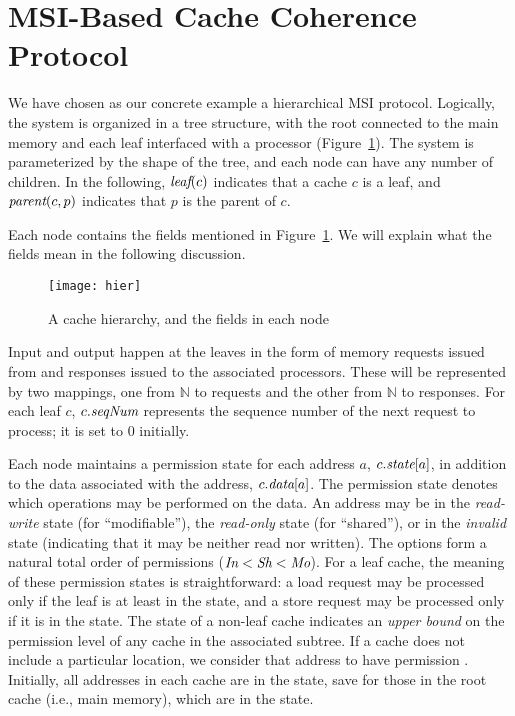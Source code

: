 \section{MSI-Based Cache Coherence Protocol}
\label{sec:System}

We have chosen as our concrete example a hierarchical MSI
protocol. Logically, the system is organized in a tree
structure, with the root connected to the main memory and each leaf interfaced
with a processor (Figure~\ref{hier}). The system is parameterized by the shape
of the tree, and each node can have any number of children.
In the following, $\textit{leaf}(c)$ indicates
that a cache $c$ is a leaf, and $\textit{parent}(c,p)$ indicates that $p$ is the parent of
$c$.

Each node contains the fields mentioned in Figure~\ref{hier}. We will
explain what the fields mean in the following discussion.

\begin{figure}
\centering
\texttt{[image: hier]}
\caption{A cache hierarchy, and the fields in each node}
\label{hier}
\end{figure}

Input and output happen at the leaves in the form of memory requests
issued from and responses issued to the associated processors. These will be
represented by two mappings, one from $\mathbb{N}$ to requests and the other
from $\mathbb{N}$ to responses. For each leaf $c$, $c.\textit{seqNum}$ represents the
sequence number of the next request to process; it is set to $0$ initially.

Each node maintains a permission state for each address $a$, $c.\textit{state}[a]$, in
addition to the data associated with the address, $c.\textit{data}[a]$. The permission
state denotes which operations may be performed on the data. An address may be
in the \emph{read-write} state \Mo{} (for ``modifiable''),
the \emph{read-only} state \Sh{} (for ``shared''), or in the \emph{invalid} state
\In{} (indicating that it may be neither read nor written). The options form a natural
total order of permissions ($\textit{In} < \textit{Sh} < \textit{Mo}$). For a leaf cache, the meaning
of these permission states is straightforward: a load request may be processed
only if the leaf is at least in the \Sh{} state, and a store request may be
processed only if it is in the \Mo{} state. The state of a non-leaf cache indicates
an \emph{upper bound} on the permission level of any cache in the associated subtree.
If a cache does not include a particular location,
we consider that address to have permission \In.  Initially, all addresses in
each cache are in the \In{} state, save for those in the root cache (i.e., main memory),
which are in the \Mo{} state.

